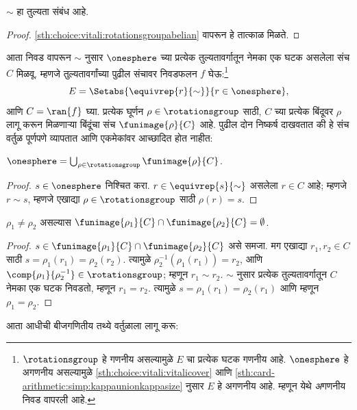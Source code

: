 \begin{lem}
$\sim$ हा तुल्यता संबंध आहे.
\end{lem}

\begin{proof}
\ref{sth:choice:vitali:rotationsgroupabelian} वापरून हे तात्काळ मिळते.
\end{proof}

आता निवड वापरून $\sim$ नुसार $\onesphere$ च्या प्रत्येक तुल्यतावर्गातून नेमका एक घटक असलेला संच $C$ मिळवू. म्हणजे तुल्यतावर्गांच्या पुढील संचावर निवडफलन $f$ घेऊ:\footnote{$\rotationsgroup$ हे गणनीय असल्यामुळे $E$ चा प्रत्येक घटक गणनीय आहे. $\onesphere$ हे अगणनीय असल्यामुळे \ref{sth:choice:vitali:vitalicover} आणि \ref{sth:card-arithmetic:simp:kappaunionkappasize} नुसार $E$ हे अगणनीय आहे. म्हणून येथे \emph{अ}गणनीय निवड वापरली आहे.}
\[
	E = \Setabs{\equivrep{r}{\sim}}{r \in \onesphere},
\]
आणि $C = \ran{f}$ घ्या. प्रत्येक घूर्णन $\rho \in \rotationsgroup$ साठी, $C$ च्या प्रत्येक बिंदूवर $\rho$ लागू करून मिळणाऱ्या बिंदूंचा संच $\funimage{\rho}{C}$ आहे. पुढील दोन निष्कर्ष दाखवतात की हे संच वर्तुळ पूर्णपणे व्यापतात आणि एकमेकांवर आच्छादित होत नाहीत:

\begin{lem}\label{sth:choice:vitali:vitalicover}
$\onesphere = \bigcup_{\rho \in \rotationsgroup} \funimage{\rho}{C}$.
\end{lem}

\begin{proof}
$s \in \onesphere$ निश्चित करा. $r \in \equivrep{s}{\sim}$ असलेला $r \in C$ आहे; म्हणजे $r \sim s$, म्हणजे एखाद्या $\rho \in \rotationsgroup$ साठी $\rho(r) = s$.
\end{proof}

\begin{lem}\label{sth:choice:vitali:vitalinooverlap}
$\rho_1 \neq \rho_2$ असल्यास $\funimage{\rho_1}{C} \cap \funimage{\rho_2}{C} = \emptyset$.
\end{lem}

\begin{proof}
$s \in \funimage{\rho_{1}}{C} \cap \funimage{\rho_{2}}{C}$ असे समजा. मग एखाद्या $r_{1}, r_{2} \in C$ साठी $s = \rho_{1}(r_{1}) = \rho_{2}(r_{2})$.
त्यामुळे $\rho^{-1}_2(\rho_1(r_1)) = r_2$, आणि $\comp{\rho_1}{\rho^{-1}_2} \in \rotationsgroup$; म्हणून $r_{1} \sim
r_{2}$. $\sim$ नुसार प्रत्येक तुल्यतावर्गातून $C$ नेमका एक घटक निवडतो, म्हणून $r_1 = r_2$. त्यामुळे $s = \rho_1(r_1) = \rho_2(r_1)$ आणि म्हणून $\rho_1 = \rho_2$.
\end{proof}

आता आधीची बीजगणितीय तथ्ये वर्तुळाला लागू करू:

